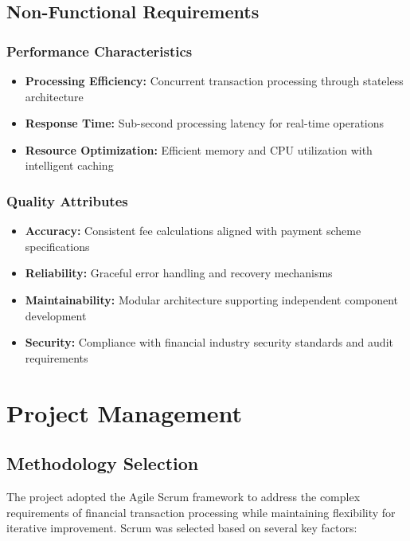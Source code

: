 \subsection{Non-Functional Requirements}

\subsubsection{Performance Characteristics}
\begin{itemize}
    \item \textbf{Processing Efficiency:} Concurrent transaction processing through stateless architecture
    \item \textbf{Response Time:} Sub-second processing latency for real-time operations
    \item \textbf{Resource Optimization:} Efficient memory and CPU utilization with intelligent caching
\end{itemize}

\subsubsection{Quality Attributes}
\begin{itemize}
    \item \textbf{Accuracy:} Consistent fee calculations aligned with payment scheme specifications
    \item \textbf{Reliability:} Graceful error handling and recovery mechanisms
    \item \textbf{Maintainability:} Modular architecture supporting independent component development
    \item \textbf{Security:} Compliance with financial industry security standards and audit requirements
\end{itemize}

\section{Project Management}

\subsection{Methodology Selection}

The project adopted the Agile Scrum framework to address the complex requirements of financial transaction processing while maintaining flexibility for iterative improvement. Scrum was selected based on several key factors:

